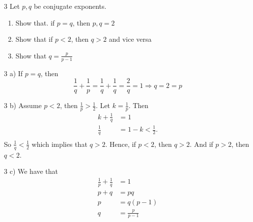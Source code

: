 \documentclass[a4paper,norsk]{article}
\begin{document}
\begin{oppgavebox}{3}{}
Let $ p, q $ be conjugate exponents.
\begin{enumerate}
  \item Show that. if $ p = q$, then $ p, q = 2 $ 
  \item Show that if $ p < 2 $, then $ q > 2 $ and vice versa
  \item Show that $ q = \frac{ p }{ p-1 } $ 
\end{enumerate}

\begin{proofbox}{3 a)}{}
  If $ p = q $, then 
  \[
      \frac{ 1 }{ q } + \frac{ 1 }{ p } = \frac{ 1 }{ q } + \frac{ 1 }{ q }= \frac{ 2 }{ q }= 1 \Rightarrow q = 2 = p 
  \]
\end{proofbox}

\begin{proofbox}{3 b)}{}
  Assume $ p < 2 $, then $ \frac{ 1 }{ p } > \frac{ 1 }{ 2 } $. Let $ k = \frac{ 1 }{ p } $. Then
  \begin{align*}
    k + \frac{ 1 }{ q } &= 1 \\
    \frac{ 1 }{ q } &= 1 - k < \frac{ 1 }{ 2 }. \\ 
  \end{align*}
  So $ \frac{ 1 }{ q } < \frac{ 1 }{ 2 } $ which implies that $ q > 2 $. Hence, if $ p < 2 $, then $ q > 2 $. And if $ p > 2 $, then $ q < 2 $.
\end{proofbox}

\begin{proofbox}{3 c)}{}
  We have that 
  \begin{align*}
    \frac{ 1 }{ p } + \frac{ 1 }{ q } &= 1 \\
    p + q &= pq\\
    p &= q \left( p - 1 \right) \\
    q &= \frac{ p }{ p-1 }
  \end{align*}
\end{proofbox}
\end{oppgavebox}
\end{document}
